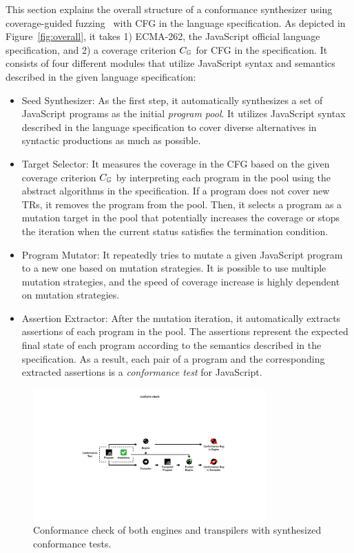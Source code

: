 This section explains the overall structure of a conformance synthesizer using
coverage-guided fuzzing~\cite{afl} with CFG in the language specification.
%
As depicted in Figure~\ref{fig:overall}, it takes 1) ECMA-262, the JavaScript
official language specification, and 2) a coverage criterion $C_{\mathbb{G}}$ for
CFG in the specification.
%
It consists of four different modules that utilize JavaScript syntax and
semantics described in the given language specification:
\begin{itemize}
  \item \textsf{Seed Synthesizer}: As the first step, it automatically
    synthesizes a set of JavaScript programs as the initial \textit{program
    pool}.
    It utilizes JavaScript syntax described in the language specification to
    cover diverse alternatives in syntactic productions as much as possible.
  \item \textsf{Target Selector}:
    It measures the coverage in the CFG based on the given coverage criterion
    $C_{\mathbb{G}}$ by interpreting each program in the pool using the abstract
    algorithms in the specification.
    If a program does not cover new TRs, it removes the program from the pool.
    Then, it selects a program as a mutation target in the pool that potentially
    increases the coverage or stops the iteration when the current status
    satisfies the termination condition.
  \item \textsf{Program Mutator}:
    It repeatedly tries to mutate a given JavaScript program to a new one based
    on mutation strategies.
    It is possible to use multiple mutation strategies, and the speed of
    coverage increase is highly dependent on mutation strategies.
  \item \textsf{Assertion Extractor}:
    After the mutation iteration, it automatically extracts assertions of each
    program in the pool.
    The assertions represent the expected final state of each program according
    to the semantics described in the specification.
    As a result, each pair of a program and the corresponding extracted
    assertions is a \textit{conformance test} for JavaScript.
\end{itemize}


\begin{figure}
  \includegraphics[width=0.8\textwidth]{img/conform-check}
  \caption{
    Conformance check of both engines and transpilers with synthesized
    conformance tests.
  }
  \label{fig:conform-check}
\end{figure}

